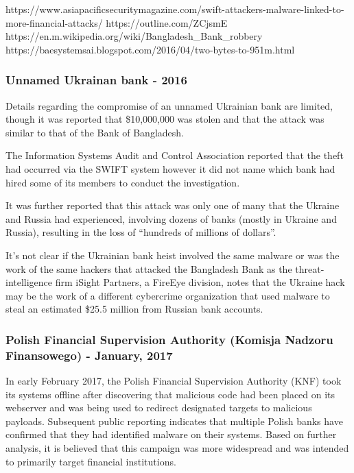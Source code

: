 \documentclass[12pt]{article}
\begin{document}
        
        https://www.asiapacificsecuritymagazine.com/swift-attackers-malware-linked-to-more-financial-attacks/
        https://outline.com/ZCjsmE
        https://en.m.wikipedia.org/wiki/Bangladesh_Bank_robbery
        https://baesystemsai.blogspot.com/2016/04/two-bytes-to-951m.html
        
    \subsubsection{Unnamed Ukrainan bank - 2016}
        Details regarding the compromise of an unnamed Ukrainian bank are limited, though it was reported that \$10,000,000 was stolen and that the attack was similar to that of the Bank of Bangladesh. 
        
        The Information Systems Audit and Control Association reported that the theft had occurred via the SWIFT system however it did not name which bank had hired some of its members to conduct the investigation.\cite{BangladeshBankEnds}
        
        It was further reported that this attack was only one of many that the Ukraine and Russia had experienced, involving dozens of banks (mostly in Ukraine and Russia), resulting in the loss of “hundreds of millions of dollars”. 
        
        It's not clear if the Ukrainian bank heist involved the same malware or was the work of the same hackers that attacked the Bangladesh Bank as the threat-intelligence firm iSight Partners, a FireEye division, notes that the Ukraine hack may be the work of a different cybercrime organization that used malware to steal an estimated \$25.5 million from Russian bank accounts.\cite{HackersReportedlySteal2016}
   
    \subsubsection{Polish Financial Supervision Authority (Komisja Nadzoru Finansowego) - January, 2017}
        
        In early February 2017, the Polish Financial Supervision Authority (KNF) took its systems offline after discovering that malicious code had been placed on its webserver and was being used to redirect designated targets to malicious payloads. Subsequent public reporting indicates that multiple Polish banks have confirmed that they had identified malware on their systems. Based on further analysis, it is believed that this campaign was more widespread and was intended to primarily target financial institutions.
        
\end{document}
